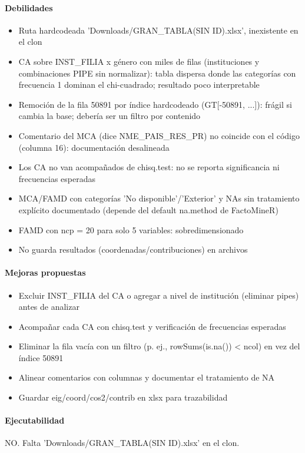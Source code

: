 \paragraph{Debilidades}
\begin{itemize}
  \item Ruta hardcodeada 'Downloads/GRAN\_TABLA(SIN ID).xlsx', inexistente en el clon
  \item CA sobre INST\_FILIA x género con miles de filas (instituciones y combinaciones PIPE sin normalizar): tabla dispersa donde las categorías con frecuencia 1 dominan el chi-cuadrado; resultado poco interpretable
  \item Remoción de la fila 50891 por índice hardcodeado (GT[-50891, ...]): frágil si cambia la base; debería ser un filtro por contenido
  \item Comentario del MCA (dice NME\_PAIS\_RES\_PR) no coincide con el código (columna 16): documentación desalineada
  \item Los CA no van acompañados de chisq.test: no se reporta significancia ni frecuencias esperadas
  \item MCA/FAMD con categorías 'No disponible'/'Exterior' y NAs sin tratamiento explícito documentado (depende del default na.method de FactoMineR)
  \item FAMD con ncp = 20 para solo 5 variables: sobredimensionado
  \item No guarda resultados (coordenadas/contribuciones) en archivos
\end{itemize}

\paragraph{Mejoras propuestas}
\begin{itemize}
  \item Excluir INST\_FILIA del CA o agregar a nivel de institución (eliminar pipes) antes de analizar
  \item Acompañar cada CA con chisq.test y verificación de frecuencias esperadas
  \item Eliminar la fila vacía con un filtro (p. ej., rowSums(is.na()) < ncol) en vez del índice 50891
  \item Alinear comentarios con columnas y documentar el tratamiento de NA
  \item Guardar eig/coord/cos2/contrib en xlsx para trazabilidad
\end{itemize}

\paragraph{Ejecutabilidad}
NO. Falta 'Downloads/GRAN\_TABLA(SIN ID).xlsx' en el clon.

